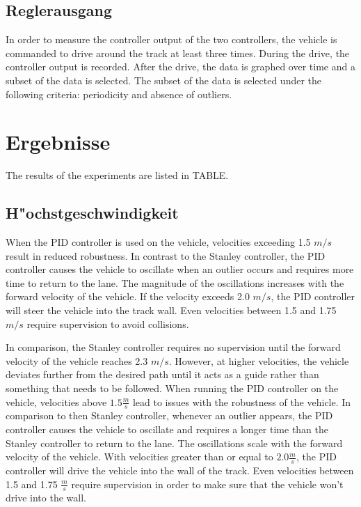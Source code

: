 \documentclass[arbeit=studie,oneside,BCOR=12mm]{ArbeitRST}
\begin{document}
\subsection{Reglerausgang}

In order to measure the controller output of the two controllers, the vehicle
is commanded to drive around the track at least three times. During the drive,
the controller output is recorded. After the drive, the data is graphed over
time and a subset of the data is selected. The subset of the data is selected
under the following criteria: periodicity and absence of outliers.

\section{Ergebnisse}

The results of the experiments are listed in TABLE. 

\subsection{H"ochstgeschwindigkeit}
When the PID controller is used on the vehicle, velocities exceeding 1.5 $m/s$
result in reduced robustness. In contrast to the Stanley controller, the PID
controller causes the vehicle to oscillate when an outlier occurs and requires
more time to return to the lane. The magnitude of the oscillations increases
with the forward velocity of the vehicle. If the velocity exceeds 2.0 $m/s$,
the PID controller will steer the vehicle into the track wall. Even velocities
between 1.5 and 1.75 $m/s$ require supervision to avoid collisions.

In comparison, the Stanley controller requires no supervision until the forward
velocity of the vehicle reaches 2.3 $m/s$. However, at higher velocities, the
vehicle deviates further from the desired path until it acts as a guide rather
than something that needs to be followed.
\iffalse
When running the PID controller on the vehicle, velocities above $1.5 \frac{m}{s}$
lead to issues with the robustness of the vehicle. In comparison to then Stanley 
controller, whenever an outlier appears, the PID controller causes the vehicle to oscillate and
requires a longer time than the Stanley controller to return to the lane. The oscillations 
scale with the forward velocity of the vehicle. With velocities greater than or equal to 
$2.0 \frac{m}{s}$, the PID controller will drive the vehicle into the wall of the track. Even 
velocities between 1.5 and 1.75 $\frac{m}{s}$ require supervision in order to make sure that the 
vehicle won't drive into the wall.
\end{document}
